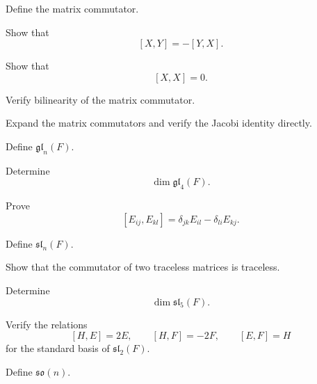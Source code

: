 \begin{exercise}[1]
Define the matrix commutator.
\end{exercise}

\begin{exercise}[2]
Show that
\[ [X,Y]=-[Y,X]. \]
\end{exercise}

\begin{exercise}[2]
Show that
\[ [X,X]=0. \]
\end{exercise}

\begin{exercise}[2]
Verify bilinearity of the matrix commutator.
\end{exercise}

\begin{exercise}[3]
Expand the matrix commutators and verify the Jacobi identity directly.
\end{exercise}

\begin{exercise}[1]
Define \(\mathfrak{gl}_n(F)\).
\end{exercise}

\begin{exercise}[1]
Determine
\[ \dim\mathfrak{gl}_4(F). \]
\end{exercise}

\begin{exercise}[2]
Prove
\[ [E_{ij},E_{kl}]
=\delta_{jk}E_{il}-\delta_{li}E_{kj}. \]
\end{exercise}

\begin{exercise}[1]
Define \(\mathfrak{sl}_n(F)\).
\end{exercise}

\begin{exercise}[2]
Show that the commutator of two traceless matrices is traceless.
\end{exercise}

\begin{exercise}[1]
Determine
\[ \dim\mathfrak{sl}_5(F). \]
\end{exercise}

\begin{exercise}[2]
Verify the relations
\[ [H,E]=2E,\qquad[H,F]=-2F,\qquad[E,F]=H \]
for the standard basis of \(\mathfrak{sl}_2(F)\).
\end{exercise}

\begin{exercise}[1]
Define \(\mathfrak{so}(n)\).
\end{exercise}

